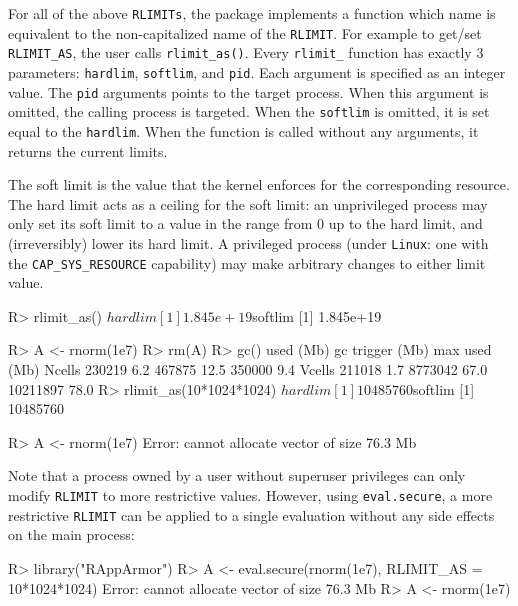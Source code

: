 \documentclass{jss}
\newcommand{\RAppArmor}{\pkg{RAppArmor}\xspace}
\newcommand{\Linux}{\texttt{Linux}\xspace}
\begin{document}
For all of the above \texttt{RLIMITs}, the \RAppArmor package implements a
function which name is equivalent to the non-capitalized name of the
\texttt{RLIMIT}. For example to get/set \texttt{RLIMIT\_AS}, the user calls
\texttt{rlimit\_as()}. Every \texttt{rlimit\_} function has exactly 3 parameters:
\texttt{hardlim}, \texttt{softlim}, and \texttt{pid}. Each argument is
specified as an integer value. The \texttt{pid} arguments points to the target
process. When this argument is omitted, the calling process is targeted. When
the \texttt{softlim} is omitted, it is set equal to the \texttt{hardlim}.
When the function is called without any arguments, it returns the current limits.

The soft limit is the value that the kernel enforces for the corresponding
resource. The hard limit acts as a ceiling for the soft limit: an unprivileged
process may only set its soft limit to a value in the range from 0 up to the
hard limit, and (irreversibly) lower its hard limit. A  privileged process
(under  \Linux:  one  with  the \texttt{CAP\_SYS\_RESOURCE} capability) may make
arbitrary changes to either limit value.  \citep{linuxrlimit}

\begin{CodeChunk}
\begin{CodeInput}
R> rlimit_as()
$hardlim
[1] 1.845e+19

$softlim
[1] 1.845e+19

R> A <- rnorm(1e7)
R> rm(A)
R> gc()
         used (Mb) gc trigger (Mb) max used (Mb)
Ncells 230219  6.2     467875 12.5   350000  9.4
Vcells 211018  1.7    8773042 67.0 10211897 78.0
R> rlimit_as(10*1024*1024)
$hardlim
[1] 10485760

$softlim
[1] 10485760

R> A <- rnorm(1e7)
Error: cannot allocate vector of size 76.3 Mb
\end{CodeInput}
\end{CodeChunk}

Note that a process owned by a user without superuser privileges can only modify
\texttt{RLIMIT} to more restrictive values. However, using \texttt{eval.secure},
a more restrictive \texttt{RLIMIT} can be applied to a single evaluation without
any side effects on the main process:

\begin{CodeChunk}
\begin{CodeInput}
R> library("RAppArmor")
R> A <- eval.secure(rnorm(1e7), RLIMIT_AS = 10*1024*1024)
Error: cannot allocate vector of size 76.3 Mb
R> A <- rnorm(1e7)
\end{CodeInput}
\end{CodeChunk}
\end{document}

